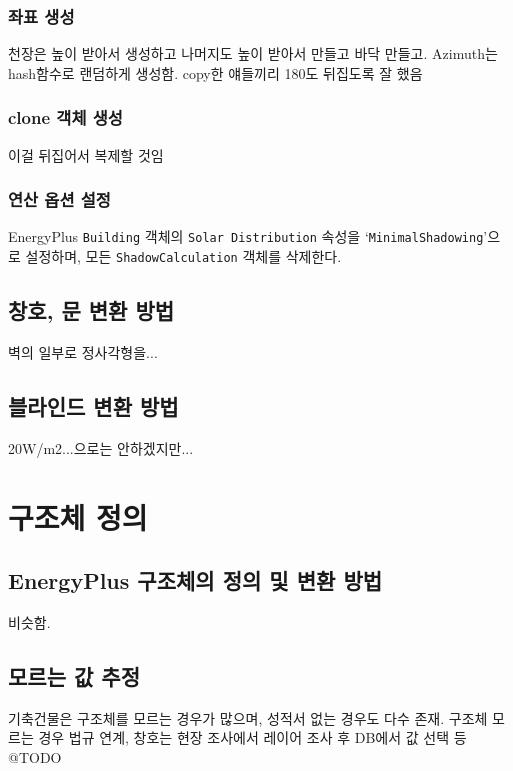 \subsubsection{좌표 생성}
천장은 높이 받아서 생성하고 나머지도 높이 받아서 만들고 바닥 만들고.
Azimuth는 hash함수로 랜덤하게 생성함. copy한 얘들끼리 180도 뒤집도록 잘 했음

\subsubsection{clone 객체 생성}
이걸 뒤집어서 복제할 것임

\subsubsection{연산 옵션 설정}
EnergyPlus \texttt{Building} 객체의 \texttt{Solar Distribution} 속성을 `\texttt{MinimalShadowing}'으로 설정하며, 모든 \texttt{ShadowCalculation} 객체를 삭제한다.

\subsection{창호, 문 변환 방법}
벽의 일부로 정사각형을...

\subsection{블라인드 변환 방법}
20W/m2...으로는 안하겠지만...


\section{구조체 정의}
\subsection{EnergyPlus 구조체의 정의 및 변환 방법}
비슷함.

\subsection{모르는 값 추정}
기축건물은 구조체를 모르는 경우가 많으며, 성적서 없는 경우도 다수 존재.
구조체 모르는 경우 법규 연계, 창호는 현장 조사에서 레이어 조사 후 DB에서 값 선택 등 @TODO

